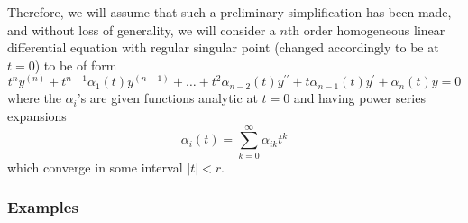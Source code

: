 \documentclass{article}
\theoremstyle{remark}
\theoremstyle{definition}
\begin{document}
      Therefore, we will assume that such a preliminary simplification has been made, and without loss of generality, we will consider a $n$th order homogeneous linear differential equation with regular singular point (changed accordingly to be at $t = 0$) to be of form
      \[t^n y^{(n)} + t^{n-1} \alpha_1 (t) y^{(n-1)} + \ldots + t^2 \alpha_{n-2} (t) y^{\prime\prime} + t \alpha_{n-1} (t) y^\prime + \alpha_n (t) y = 0\]
      where the $\alpha_i$'s are given functions analytic at $t = 0$ and having power series expansions 
      \[\alpha_i (t) = \sum_{k=0}^\infty \alpha_{ik} t^k\]
      which converge in some interval $|t|<r$. 

    \subsubsection{Examples}
\end{document}
